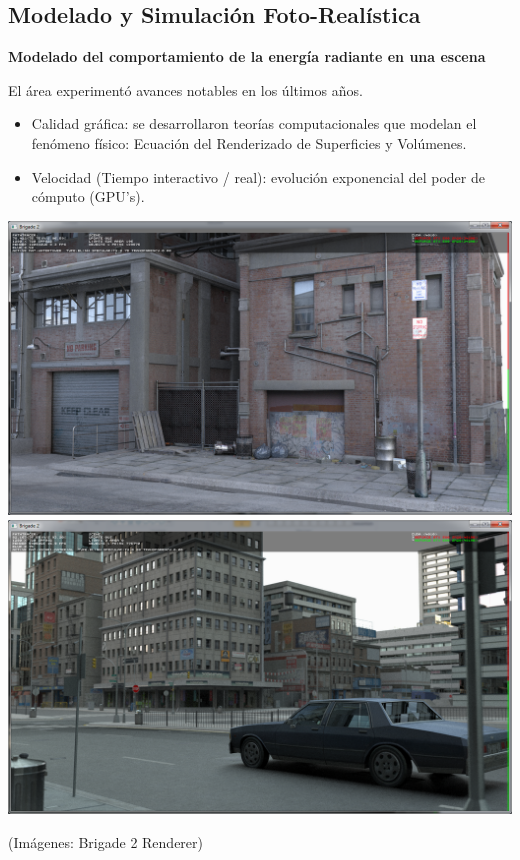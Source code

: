 \documentclass[spanish]{beamer}
\begin{document}
\subsection{Modelado y Simulación Foto-Realística}
\begin{frame}{}

\textbf{Modelado del comportamiento de la energía radiante en una escena}

El área experimentó avances notables en los últimos años.
\begin{block}{}
\begin{itemize}
\item Calidad gráfica: se desarrollaron teorías computacionales que modelan el fenómeno físico: Ecuación del Renderizado de Superficies y Volúmenes.
\item Velocidad (Tiempo interactivo / real): evolución exponencial del poder de cómputo (GPU's).
\end{itemize}
\end{block}

\includegraphics[scale = 0.15]{../figures/hd1.png}
\includegraphics[scale = 0.15]{../figures/blinn5ed.png}

(Imágenes: Brigade 2 Renderer)


\end{frame}
\end{document}
